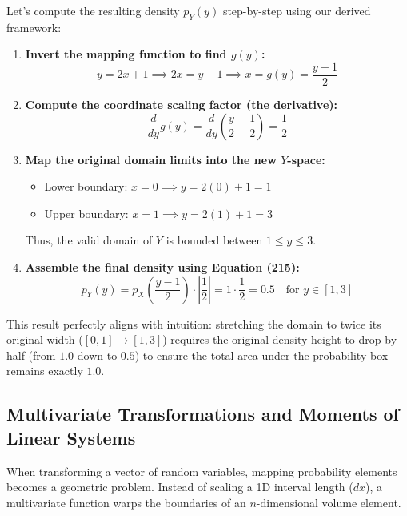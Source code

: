 \documentclass{article}
\begin{document}
Let's compute the resulting density $p_Y(y)$ step-by-step using our derived framework:
\begin{enumerate}
    \item \textbf{Invert the mapping function to find $g(y)$:}
    \begin{equation*}
    y = 2x + 1 \implies 2x = y - 1 \implies x = g(y) = \frac{y - 1}{2}
    \end{equation*}
    \item \textbf{Compute the coordinate scaling factor (the derivative):}
    \begin{equation*}
    \frac{d}{dy} g(y) = \frac{d}{dy} \left( \frac{y}{2} - \frac{1}{2} \right) = \frac{1}{2}
    \end{equation*}
    \item \textbf{Map the original domain limits into the new $Y$-space:}
    \begin{itemize}
        \item Lower boundary: $x = 0 \implies y = 2(0) + 1 = 1$
        \item Upper boundary: $x = 1 \implies y = 2(1) + 1 = 3$
    \end{itemize}
    Thus, the valid domain of $Y$ is bounded between $1 \le y \le 3$.
    \item \textbf{Assemble the final density using Equation (215):}
    \begin{equation*}
    p_Y(y) = p_X\left(\frac{y-1}{2}\right) \cdot \left| \frac{1}{2} \right| = 1 \cdot \frac{1}{2} = \mathbf{0.5} \quad \text{for } y \in [1, 3]
    \end{equation*}
\end{enumerate}

This result perfectly aligns with intuition: stretching the domain to twice its original width ($[0,1] \to [1,3]$) requires the original density height to drop by half (from $1.0$ down to $0.5$) to ensure the total area under the probability box remains exactly $1.0$.

\subsection*{Multivariate Transformations and Moments of Linear Systems}

When transforming a vector of random variables, mapping probability elements becomes a geometric problem. Instead of scaling a 1D interval length ($dx$), a multivariate function warps the boundaries of an $n$-dimensional volume element.
\end{document}
